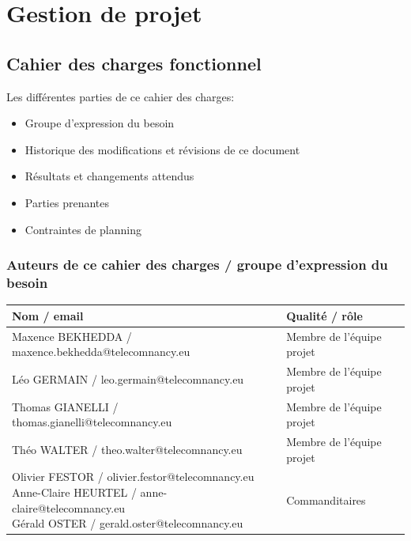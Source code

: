 \documentclass[11pt]{article}
\begin{document}
\section{Gestion de projet}

\subsection{Cahier des charges fonctionnel}

Les différentes parties de ce cahier des charges:
\begin{itemize} 
\item Groupe d’expression du besoin
\item Historique des modifications et révisions de ce document
\item Résultats et changements attendus
\item Parties prenantes
\item Contraintes de planning
\end{itemize}

\subsubsection{Auteurs de ce cahier des charges / groupe d’expression du besoin}
\begin{center}
	\begin{tabular}{|l|l|}
	\hline
		\textbf{Nom / email}	& \textbf{Qualité / rôle}\\
		\hline
Maxence BEKHEDDA / maxence.bekhedda@telecomnancy.eu&
Membre de l’équipe projet\\
\hline
Léo GERMAIN / leo.germain@telecomnancy.eu&
Membre de l’équipe projet\\
\hline
Thomas GIANELLI / thomas.gianelli@telecomnancy.eu&
Membre de l’équipe projet\\
\hline
Théo WALTER / theo.walter@telecomnancy.eu&
Membre de l’équipe projet\\
\hline
\makecell[l]{
Olivier FESTOR / olivier.festor@telecomnancy.eu\\
Anne-Claire HEURTEL / anne-claire@telecomnancy.eu\\
Gérald OSTER / gerald.oster@telecomnancy.eu}&
Commanditaires\\
\hline
	\end{tabular}
\end{center}
\end{document}

